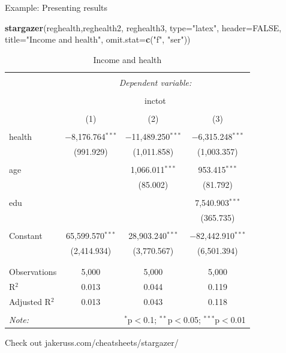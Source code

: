 \documentclass[
  ignorenonframetext,
]{beamer}
\newenvironment{Shaded}{\begin{snugshade}}{\end{snugshade}}
\newcommand{\DataTypeTok}[1]{\textcolor[rgb]{0.13,0.29,0.53}{#1}}
\newcommand{\KeywordTok}[1]{\textcolor[rgb]{0.13,0.29,0.53}{\textbf{#1}}}
\newcommand{\NormalTok}[1]{#1}
\newcommand{\OtherTok}[1]{\textcolor[rgb]{0.56,0.35,0.01}{#1}}
\newcommand{\StringTok}[1]{\textcolor[rgb]{0.31,0.60,0.02}{#1}}
\begin{document}
\begin{frame}[fragile]{Example: Presenting results}
\protect\hypertarget{example-presenting-results}{}
\tiny

\begin{Shaded}
\begin{Highlighting}[]
\KeywordTok{stargazer}\NormalTok{(reghealth,reghealth2, reghealth3, }\DataTypeTok{type=}\StringTok{"latex"}\NormalTok{, }\DataTypeTok{header=}\OtherTok{FALSE}\NormalTok{, }
          \DataTypeTok{title=}\StringTok{"Income and health"}\NormalTok{, }\DataTypeTok{omit.stat=}\KeywordTok{c}\NormalTok{(}\StringTok{"f"}\NormalTok{, }\StringTok{"ser"}\NormalTok{))}
\end{Highlighting}
\end{Shaded}

\begin{table}[!htbp] \centering 
  \caption{Income and health} 
  \label{} 
\begin{tabular}{@{\extracolsep{5pt}}lccc} 
\\[-1.8ex]\hline 
\hline \\[-1.8ex] 
 & \multicolumn{3}{c}{\textit{Dependent variable:}} \\ 
\cline{2-4} 
\\[-1.8ex] & \multicolumn{3}{c}{inctot} \\ 
\\[-1.8ex] & (1) & (2) & (3)\\ 
\hline \\[-1.8ex] 
 health & $-$8,176.764$^{***}$ & $-$11,489.250$^{***}$ & $-$6,315.248$^{***}$ \\ 
  & (991.929) & (1,011.858) & (1,003.357) \\ 
  & & & \\ 
 age &  & 1,066.011$^{***}$ & 953.415$^{***}$ \\ 
  &  & (85.002) & (81.792) \\ 
  & & & \\ 
 edu &  &  & 7,540.903$^{***}$ \\ 
  &  &  & (365.735) \\ 
  & & & \\ 
 Constant & 65,599.570$^{***}$ & 28,903.240$^{***}$ & $-$82,442.910$^{***}$ \\ 
  & (2,414.934) & (3,770.567) & (6,501.394) \\ 
  & & & \\ 
\hline \\[-1.8ex] 
Observations & 5,000 & 5,000 & 5,000 \\ 
R$^{2}$ & 0.013 & 0.044 & 0.119 \\ 
Adjusted R$^{2}$ & 0.013 & 0.043 & 0.118 \\ 
\hline 
\hline \\[-1.8ex] 
\textit{Note:}  & \multicolumn{3}{r}{$^{*}$p$<$0.1; $^{**}$p$<$0.05; $^{***}$p$<$0.01} \\ 
\end{tabular} 
\end{table} 
\normalsize

Check out jakeruss.com/cheatsheets/stargazer/
\end{frame}
\end{document}
